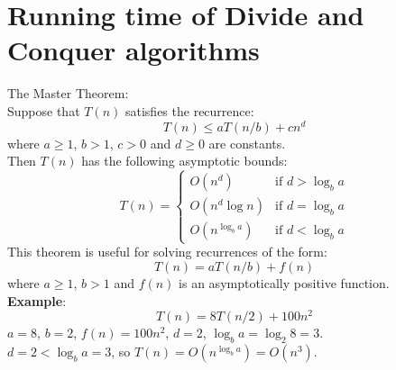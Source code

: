 \documentclass[onecolumn]{report}
\begin{document}
\section{Running time of Divide and Conquer algorithms}
The Master Theorem:\\
Suppose that $T(n)$ satisfies the recurrence:
\begin{equation*}
    T(n) \leq aT(n/b) + cn^d
\end{equation*}
where $a \geq 1$, $b > 1$, $c > 0$ and $d \geq 0$ are constants.\\
Then $T(n)$ has the following asymptotic bounds:\\
\begin{equation*}
    T(n) = \begin{cases}
    O(n^d) & \text{if } d > \log_b a\\
    O(n^d\log n) & \text{if } d = \log_b a\\
    O(n^{\log_b a}) & \text{if } d < \log_b a
    \end{cases}
\end{equation*}
This theorem is useful for solving recurrences of the form:
\begin{equation*}
    T(n) = aT(n/b) + f(n)
\end{equation*}
where $a \geq 1$, $b > 1$ and $f(n)$ is an asymptotically positive function.\\
\textbf{Example}:\\
\begin{equation*}
    T(n) = 8T(n/2) + 100n^2
\end{equation*}
$a = 8$, $b = 2$, $f(n) = 100n^2$, $d = 2$, $\log_b a = \log_2 8 = 3$.\\
$d = 2 < \log_b a = 3$, so $T(n) = O(n^{\log_b a}) = O(n^3)$.\\
\end{document}
